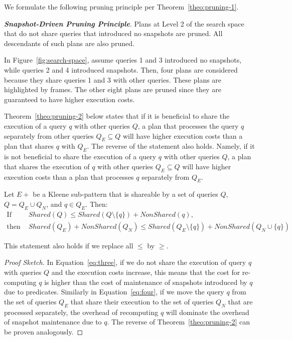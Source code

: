 We formulate the following pruning principle per Theorem~\ref{theo:pruning-1}.

\textbf{\textit{Snapshot-Driven Pruning Principle}}. 
Plans at Level 2 of the search space that do not share queries that introduced no snapshots are pruned. All descendants of such plans are also pruned.

\begin{example}
%
In Figure~\ref{fig:search-space}, assume queries 1 and 3 introduced no snapshots, while queries 2 and 4 introduced snapshots.
Then, four plans are considered because they share queries 1 and 3 with other queries. These plans are highlighted by frames. The other eight plans are pruned since they are guaranteed to have higher execution costs.
%
\end{example}

Theorem~\ref{theo:pruning-2} below states that 
if it is beneficial to share the execution of a query $q$ with other queries $Q$, a plan that processes the query $q$ separately from other queries $Q_E \subseteq Q$ will have higher execution costs than a plan that shares $q$ with $Q_E$.
The reverse of the statement also holds. Namely, if it is not beneficial to share the execution of a query $q$ with other queries $Q$, a plan that shares the execution of $q$ with other queries $Q_E \subseteq Q$ will have higher execution costs than a plan that processes $q$ separately from $Q_E$.


\begin{theorem}
%
Let $E+$ be a Kleene sub-pattern that is shareable by a set of queries $Q$, 
$Q = Q_E \cup Q_N$, and 
$q \in Q_E$. Then:
%
\begin{align}
\text{If } 
& \mathit{Shared}(Q) \leq \mathit{Shared}(Q \setminus \{q\}) + \mathit{NonShared}(q) \text{,} 
\label{eq:three}\\
\text{then } 
& \mathit{Shared}(Q_E) + \mathit{NonShared}(Q_N) \leq
\mathit{Shared}(Q_E \setminus \{q\}) +
\mathit{NonShared}(Q_N \cup \{q\}) 
\label{eq:four}
\end{align}

This statement also holds if we replace all $\leq$ by $\geq$.
%
\label{theo:pruning-2}
\end{theorem}

\begin{proof}[Proof Sketch]
%
In Equation~\ref{eq:three}, if we do not share the execution of query $q$ with queries $Q$ and the execution costs increase, this means that the cost for re-computing $q$ is higher than the cost of maintenance of snapshots introduced by $q$ due to predicates.
Similarly in Equation~\ref{eq:four}, if we move the query $q$ from the set of queries $Q_E$ that share their execution to the set of queries $Q_N$ that are processed separately, the overhead of recomputing $q$ will dominate the overhead of snapshot maintenance due to $q$.
The reverse of Theorem~\ref{theo:pruning-2} can be proven analogously. 
%
\end{proof}

